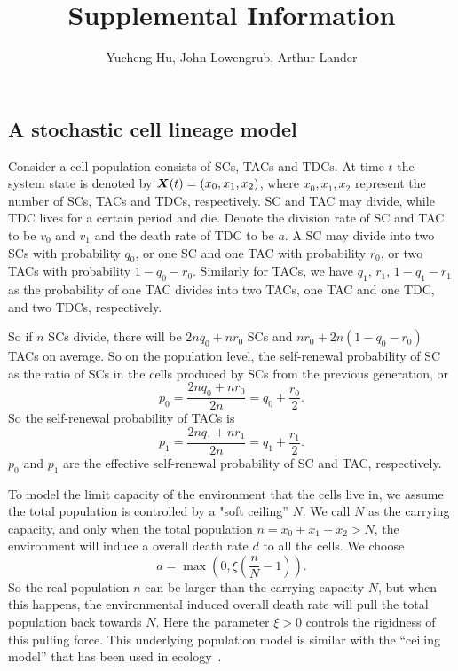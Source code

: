 \documentclass[12pt]{article}
\newcommand{\bfmath}[1]{{\mathchoice
    {\mbox{\boldmath$\displaystyle#1$}}
    {\mbox{\boldmath$\textstyle#1$}}
    {\mbox{\boldmath$\scriptstyle#1$}}
    {\mbox{\boldmath$\scriptscriptstyle#1$}}}}
\begin{document}
\title{Supplemental Information}

\author{Yucheng Hu, John Lowengrub, Arthur Lander}
\date{}
\maketitle

\subsection*{A stochastic cell lineage model}
Consider a cell population consists of SCs, TACs and TDCs. 
At time $t$ the system state is denoted by 
$\bfmath{X}(t) = \left( x_0, x_1, x_2 \right)$,
where $x_0, x_1, x_2$ represent the number of SCs, TACs and TDCs, respectively.
SC and TAC may divide, while TDC lives for a certain period and die. 
Denote the division rate of SC and TAC to be $v_0$ and $v_1$ 
and the death rate of TDC to be $a$.
A SC may divide into two SCs with probability $q_0$, 
or one SC and one TAC with probability $r_0$, 
or two TACs with probability $1-q_0-r_0$.
Similarly for TACs, we have $q_1$, $r_1$, $1-q_1-r_1$ as the probability 
of one TAC divides into two TACs, one TAC and one TDC, 
and two TDCs, respectively. 

So if $n$ SCs divide, there will be $2nq_0+nr_0$ SCs 
and $nr_0+2n(1-q_0-r_0)$ TACs on average. 
So on the population level, the self-renewal probability 
of SC as the ratio of SCs in the cells produced by SCs 
from the previous generation, or 
\begin{equation}
p_0 = \frac{2nq_0 + nr_0}{2n} = q_0+\frac{r_0}{2}.
\label{eq_popp0}
\end{equation} 
So the self-renewal probability of TACs is
\begin{equation}
p_1 = \frac{2nq_1 + nr_1}{2n} = q_1 + \frac{r_1}{2}.
\label{eq_popp1}
\end{equation}
$p_0$ and $p_1$ are the effective self-renewal probability 
of SC and TAC, respectively.

To model the limit capacity of the environment that the cells live in, 
we assume the total population is controlled by a "soft ceiling'' $N$.
We call $N$ as the carrying capacity, and 
only when the total population $n=x_0+x_1+x_2 > N$, 
the environment will induce a overall death rate $d$
to all the cells. We choose 
\begin{equation}
a = \max \left( 0, \xi \left( \frac{n}{N} - 1\right) \right).
\label{eq_d}
\end{equation} 
So the real population $n$ can be larger 
than the carrying capacity $N$, but when this happens,
the environmental induced overall death rate will 
pull the total population back towards $N$.
Here the parameter $\xi>0$ controls the 
rigidness of this pulling force.
This underlying population model is similar 
with the ``ceiling model'' that has been used 
in ecology~\cite{Lindenmayer95}.
\end{document}
